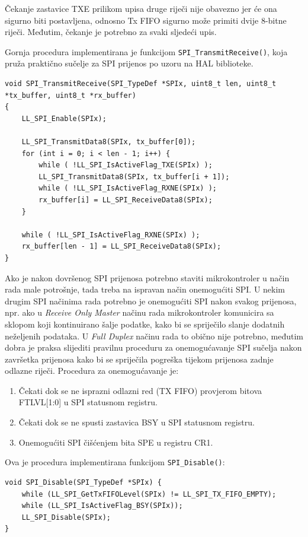 Čekanje zastavice TXE prilikom upisa druge riječi nije obavezno jer će ona sigurno biti postavljena, odnosno Tx FIFO sigurno može primiti dvije 8-bitne riječi. Međutim, čekanje je potrebno za svaki sljedeći upis.

Gornja procedura implementirana je funkcijom \texttt{SPI\_TransmitReceive()}, koja pruža praktično sučelje za SPI prijenos po uzoru na HAL biblioteke.

\begin{lstlisting}[caption={Funkcija za slanje i primanje podataka putem SPI sučelja}]
void SPI_TransmitReceive(SPI_TypeDef *SPIx, uint8_t len, uint8_t *tx_buffer, uint8_t *rx_buffer) 
{
	LL_SPI_Enable(SPIx);
	
	LL_SPI_TransmitData8(SPIx, tx_buffer[0]);
	for (int i = 0; i < len - 1; i++) {
		while ( !LL_SPI_IsActiveFlag_TXE(SPIx) );
		LL_SPI_TransmitData8(SPIx, tx_buffer[i + 1]);
		while ( !LL_SPI_IsActiveFlag_RXNE(SPIx) );
		rx_buffer[i] = LL_SPI_ReceiveData8(SPIx);
	}
	
	while ( !LL_SPI_IsActiveFlag_RXNE(SPIx) );
	rx_buffer[len - 1] = LL_SPI_ReceiveData8(SPIx);
}
\end{lstlisting}

Ako je nakon dovršenog SPI prijenosa potrebno staviti mikrokontroler u način rada male potrošnje, tada treba na ispravan način onemogućiti SPI. U nekim drugim SPI načinima rada potrebno je onemogućiti SPI nakon svakog prijenosa, npr. ako u \textit{Receive Only Master} načinu rada mikrokontroler komunicira sa sklopom koji kontinuirano šalje podatke, kako bi se spriječilo slanje dodatnih neželjenih podataka. U \textit{Full Duplex} načinu rada to obično nije potrebno, međutim dobra je praksa slijediti pravilnu proceduru za onemogućavanje SPI sučelja nakon završetka prijenosa kako bi se spriječila pogreška tijekom prijenosa zadnje odlazne riječi. Procedura za onemogućavanje je:

\begin{enumerate}
	\item Čekati dok se ne isprazni odlazni red (TX FIFO) provjerom bitova FTLVL[1:0] u SPI statusnom registru.
	\item Čekati dok se ne spusti zastavica BSY u SPI statusnom registru.
	\item Onemogućiti SPI čišćenjem bita SPE u registru CR1.
\end{enumerate}

Ova je procedura implementirana funkcijom \texttt{SPI\_Disable()}:

\begin{lstlisting}[caption={Funkcija za onemogućavanje SPI sučelja}]
void SPI_Disable(SPI_TypeDef *SPIx) {
	while (LL_SPI_GetTxFIFOLevel(SPIx) != LL_SPI_TX_FIFO_EMPTY);
	while (LL_SPI_IsActiveFlag_BSY(SPIx));
	LL_SPI_Disable(SPIx);
}
\end{lstlisting}

